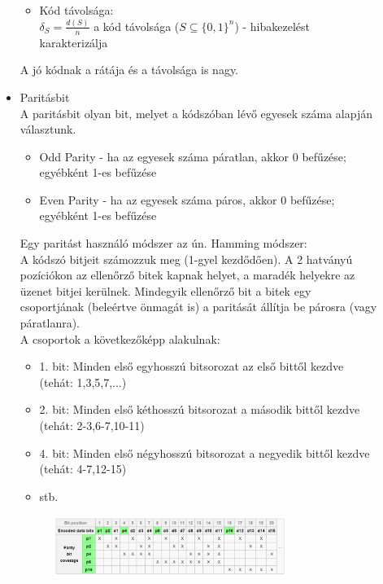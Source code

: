 \documentclass[margin=0px]{article}
\begin{document}
\begin{description}
\begin{itemize}
\begin{itemize}
                      \item Kód távolsága: \\
                            $\delta_S = \frac{d(S)}{n}$ a kód távolsága  ($S \subseteq \{0,1\}^n$) - hibakezelést karakterizálja
                  \end{itemize}
                  A jó kódnak a rátája és a távolsága is nagy.
            \item Paritásbit \\
                  A paritásbit olyan bit, melyet a kódszóban lévő egyesek száma alapján választunk.
                  \begin{itemize}
                      \item Odd Parity - ha az egyesek száma páratlan, akkor 0 befűzése; egyébként 1-es befűzése
                      \item Even Parity - ha az egyesek száma páros, akkor 0 befűzése; egyébként 1-es befűzése
                  \end{itemize}
                  Egy paritást használó módszer az ún. Hamming módszer:\\
                  A kódszó bitjeit számozzuk meg (1-gyel kezdődően). A 2 hatványú pozíciókon az ellenőrző bitek kapnak helyet, a maradék helyekre az üzenet bitjei kerülnek. Mindegyik ellenőrző bit a bitek egy csoportjának (beleértve önmagát is) a paritását állítja be párosra (vagy páratlanra).\\
                  A csoportok a következőképp alakulnak:
                  \begin{itemize}
                      \item 1. bit: Minden első egyhosszú bitsorozat az első bittől kezdve (tehát: 1,3,5,7,...)
                      \item 2. bit: Minden első kéthosszú bitsorozat a második bittől kezdve (tehát: 2-3,6-7,10-11)
                      \item 4. bit: Minden első négyhosszú bitsorozat a negyedik bittől kezdve (tehát: 4-7,12-15)
                      \item stb.
                  \end{itemize}
                  \begin{figure}[H]
                      \centering
                      \includegraphics[width=0.8\textwidth]{img/paritasbit.png}

\end{figure}
\end{itemize}
\end{description}
\end{document}
